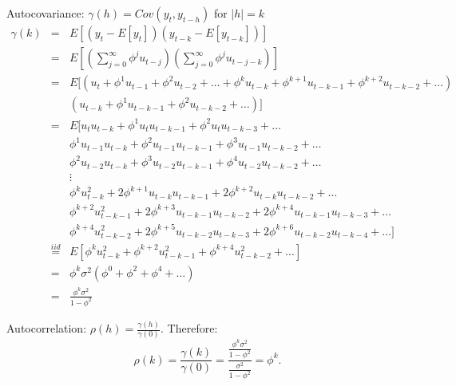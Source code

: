 \documentclass[a4paper]{scrartcl}
\begin{document}
\begin{enumerate}
\begin{solution}
                  Autocovariance: $\gamma(h)  = Cov(y_{t}, y_{t-h})$ for $|h| = k$
                  \begin{eqnarray*}
                      \gamma(k)
                      &=& E[(y_{t}-E[y_{t}])(y_{t-k}-E[y_{t-k}])] \\
                      &=& E[(\sum_{j=0}^{\infty} \phi^j
                              u_{t-j})(\sum_{j=0}^{\infty} \phi^j u_{t-j-k})] \\
                      &=& E[(u_{t} + \phi^1 u_{t-1} + \phi^2 u_{t-2} + \dots +
                              \phi^k u_{t-k}  + \phi^{k+1} u_{t-k-1} + \phi^{k+2} u_{t-k-2} + \dots) \\
                              && 	(u_{t-k}  + \phi^{1} u_{t-k-1} + \phi^{2} u_{t-k-2} + \dots)] \\
                      &=& E[u_{t}u_{t-k} + \phi^1 u_{t} u_{t-k-1} + \phi^2 u_{t}
                      u_{t-k-3} + \dots   \\
                      &&	\phi^1 u_{t-1}u_{t-k} + \phi^2 u_{t-1}u_{t-k-1}	+ \phi^3 
                      u_{t-1}u_{t-k-2} + \dots \\
                      && 	\phi^2 u_{t-2}u_{t-k} + \phi^3 u_{t-2}u_{t-k-1}	+ 
                      \phi^4 u_{t-2}u_{t-k-2} + \dots \\
                      &&	\vdots \\
                      &&  \phi^{k} u_{t-k}^2 + 2\phi^{k+1} u_{t-k}u_{t-k-1}	+ 	
                      2\phi^{k+2} u_{t-k}u_{t-k-2} + \dots \\
                      && 	\phi^{k+2} u_{t-k-1}^2 + 2\phi^{k+3} u_{t-k-1}u_{t-k-2} +
                      2\phi^{k+4} u_{t-k-1}u_{t-k-3} + \dots \\ 
                      && 	\phi^{k+4} u_{t-k-2}^2 + 2\phi^{k+5} u_{t-k-2}u_{t-k-3} +
                      2\phi^{k+6} u_{t-k-2}u_{t-k-4} + \dots] \\
                      &\overset{iid}{=}& 
                      E[\phi^{k}u_{t-k}^2 + \phi^{k+2}u_{t-k-1}^2 + \phi^{k+4}u_{t-k-2}^2 + \dots] \\
                      &=& \phi^{k}\sigma^2(\phi^0 + \phi^2 + \phi^4 + \dots ) \\
                      &=& \frac{\phi^{k}\sigma^2}{1-\phi^2}
                  \end{eqnarray*}
                  
                  Autocorrelation: $\rho(h)  = \frac{\gamma(h)}{\gamma(0)}$. Therefore:
                  \begin{displaymath}
                      \rho(k) = \frac{\gamma(k)}{\gamma(0)} = \frac{\frac{\phi^{k}\sigma^2}{1-\phi^2}}{\frac{\sigma^2}{1-\phi^2}} = \phi^{k}.
                  \end{displaymath}
                  

\end{solution}
\end{enumerate}
\end{document}

